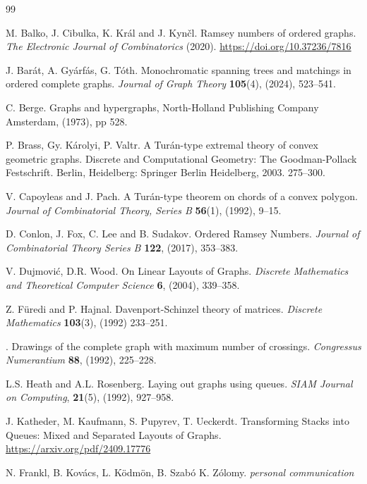 \documentclass[11pt]{article}
\theoremstyle{definition}
\begin{document}
\begin{thebibliography}{99}

 M. Balko, J. Cibulka, K. Král and J. Kyn\v cl.
Ramsey numbers of ordered graphs.
{\it The Electronic Journal of Combinatorics}
(2020). \url{https://doi.org/10.37236/7816}


J. Barát, A. Gyárfás, G. Tóth.
Monochromatic spanning trees and matchings in ordered complete graphs.
{\it Journal of Graph Theory}  {\bf 105}(4), (2024), 523--541.

C.  Berge. Graphs and hypergraphs, 
North-Holland Publishing Company Amsterdam, (1973), pp 528. 

 P. Brass, Gy. Károlyi, P. Valtr. 
A Turán-type extremal theory of convex geometric graphs. Discrete and Computational Geometry: The Goodman-Pollack Festschrift. Berlin, Heidelberg: Springer Berlin Heidelberg, 2003. 275--300.


 V. Capoyleas and J. Pach. 
A Tur\'an-type theorem on chords of a convex polygon. {\it Journal of Combinatorial Theory, Series B} {\bf 56}(1), (1992), 9--15.

D. Conlon, J. Fox, C. Lee and B. Sudakov.
Ordered Ramsey Numbers.
{\it Journal of Combinatorial Theory Series B}
{\bf 122}, (2017), 353--383.

 V. Dujmovi\'c, D.R. Wood.
On Linear Layouts of Graphs.
{\it Discrete Mathematics and Theoretical Computer Science} {\bf 6}, (2004), 339--358.

Z. Füredi and P. Hajnal. Davenport-Schinzel theory of matrices. 
{\it Discrete Mathematics} {\bf 103}(3), (1992) 233--251.

.
{Drawings of the complete graph with maximum number of crossings.}
{\it Congressus Numerantium}
{\bf 88}, (1992),
{225--228}.

L.S. Heath and A.L. Rosenberg. 
Laying out graphs using queues. 
{\it SIAM Journal on Computing}, {\bf 21}(5), (1992), 927--958. 

J. Katheder, M. Kaufmann, S. Pupyrev, T. Ueckerdt.
Transforming Stacks into Queues: Mixed and Separated Layouts of Graphs.
\url{https://arxiv.org/pdf/2409.17776}

N. Frankl, B. Kovács, L. Ködmön, B. Szabó K. Zólomy.
{\it personal communication}


\end{thebibliography}
\end{document}
